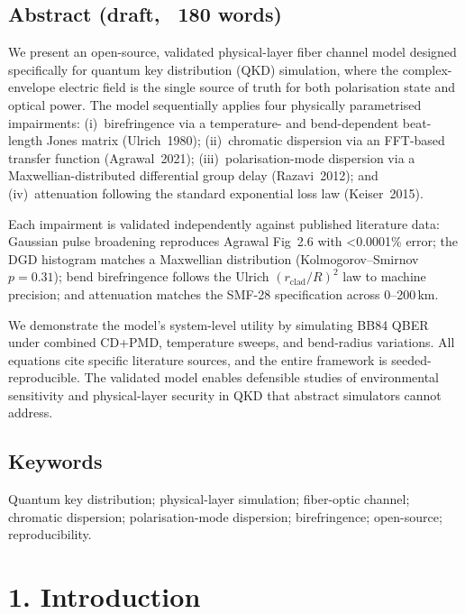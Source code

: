\documentclass[11pt,a4paper]{article}
\begin{document}
\subsection{Abstract (draft, ~180 words)}
\begin{center}\colorbox{highlightblue!5}{\begin{minipage}{0.95\textwidth}
We present an open-source, validated physical-layer fiber channel model
designed specifically for quantum key distribution (QKD) simulation, where
the complex-envelope electric field is the single source of truth for both
polarisation state and optical power.  The model sequentially applies four
physically parametrised impairments: (i)~birefringence via a temperature-
and bend-dependent beat-length Jones matrix (Ulrich~1980); (ii)~chromatic
dispersion via an FFT-based transfer function (Agrawal~2021);
(iii)~polarisation-mode dispersion via a Maxwellian-distributed differential
group delay (Razavi~2012); and (iv)~attenuation following the standard
exponential loss law (Keiser~2015).

Each impairment is validated independently against published literature
data: Gaussian pulse broadening reproduces Agrawal Fig~2.6 with
\textless0.0001\% error; the DGD histogram matches a Maxwellian distribution
(Kolmogorov--Smirnov $p=0.31$); bend birefringence follows the Ulrich
$(r_{\text{clad}}/R)^2$ law to machine precision; and attenuation matches
the SMF-28 specification across 0--200\,km.

We demonstrate the model's system-level utility by simulating BB84 QBER
under combined CD+PMD, temperature sweeps, and bend-radius variations.
All equations cite specific literature sources, and the entire framework
is seeded-reproducible.  The validated model enables defensible studies of
environmental sensitivity and physical-layer security in QKD that abstract
simulators cannot address.
\end{minipage}}\end{center}

\subsection{Keywords}
Quantum key distribution; physical-layer simulation; fiber-optic channel;
chromatic dispersion; polarisation-mode dispersion; birefringence;
open-source; reproducibility.

\section{1. Introduction}
\end{document}
